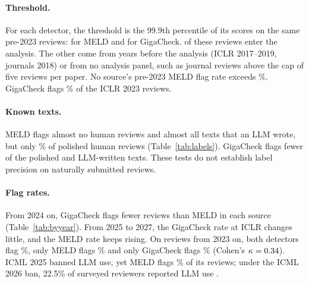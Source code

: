 \documentclass[11pt]{article}
\begin{document}
\paragraph{Threshold.}
For each detector, the threshold is the 99.9th percentile of its scores on the same \MeldCalibrationReviews{} pre-2023 reviews: \MeldThreshold{} for MELD and \GigacheckThreshold{} for GigaCheck. \ReproCalibrationInAnalysis{} of these reviews enter the analysis. The other \ReproCalibrationOutside{} come from years before the analysis (ICLR 2017--2019, journals 2018) or from no analysis panel, such as journal reviews above the cap of five reviews per paper. No source's pre-2023 MELD flag rate exceeds \MeldPreSourceMax\%. GigaCheck flags \GigacheckHeldoutFlagged\% of the ICLR 2023 reviews.

\paragraph{Known texts.}
MELD flags almost no human reviews and almost all texts that an LLM wrote, but only \PolishFlagged\% of polished human reviews (Table~\ref{tab:labels}). GigaCheck flags fewer of the polished and LLM-written texts. These tests do not establish label precision on naturally submitted reviews.

\begin{table}[!htp]
\centering\footnotesize

\caption{MELD flags almost no pre-2023 human reviews and all reviews that an LLM wrote from the paper. Shares of each set of texts of known origin. The ICLR 2023 reviews were due before ChatGPT's release. Polished: Luna polished \PolishTexts{} human reviews of 2018--2021 and kept every point. From outline: Luna rewrote \RewriteTexts{} journal reviews of 2018--2021 from an outline of their points. The panel rows are the texts of the rewrite control (RQ\ref{app:rewrite}). The last three rows are reviews that an LLM wrote from the paper alone; the five LLMs are those of \citet{yu2026reviewed}.}
\label{tab:labels}
\end{table}


\paragraph{Flag rates.}
From 2024 on, GigaCheck flags fewer reviews than MELD in each source (Table~\ref{tab:byyear}). From 2025 to 2027, the GigaCheck rate at ICLR changes little, and the MELD rate keeps rising. On \GigacheckAgreementReviews{} reviews from 2023 on, both detectors flag \GigacheckBoth\%, only MELD flags \GigacheckMeldOnly\% and only GigaCheck flags \GigacheckOnly\% (Cohen's $\kappa = 0.34$). ICML 2025 banned LLM use, yet MELD flags \IcmlFlaggedBase\% of its reviews; under the ICML 2026 ban, 22.5\% of surveyed reviewers reported LLM use \citep{kim2026icmltrial}.
\end{document}
